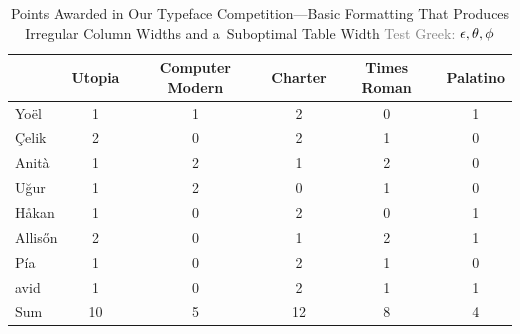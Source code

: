 


\begin{table}[t!]
	\caption{Points Awarded in Our Typeface Competition---Basic Formatting That Produces Irregular Column Widths and a~Suboptimal Table Width \textcolor{gray}{Test Greek: $\protect\epsilon, \protect\theta, \protect\phi$}}
	\label{tab:basic_formatting}
	\begin{tabular}{@{}lccccc@{}}
		\toprule
					&	Utopia	&	Computer Modern	&	Charter	&	Times Roman	&	Palatino	\\
		\midrule
		Yo\"{e}l	&	1	&	1	&	2	&	0	&	1	\\
		\c{C}elik	&	2	&	0	&	2	&	1	&	0	\\
		Anit\`{a}	&	1	&	2	&	1	&	2	&	0	\\
		U\u{g}ur	&	1	&	2	&	0	&	1	&	0	\\
		H\r{a}kan	&	1	&	0	&	2	&	0	&	1	\\
		Allis\H{o}n		&	2	&	0	&	1	&	2	&	1	\\
		P\'{i}a		&	1	&	0	&	2	&	1	&	0	\\
		\DH avid		&	1	&	0	&	2	&	1	&	1	\\
		\midrule
		Sum			&  10	&	5	&	12	&	8	&	4	\\
		\bottomrule
	\end{tabular}
\end{table}

